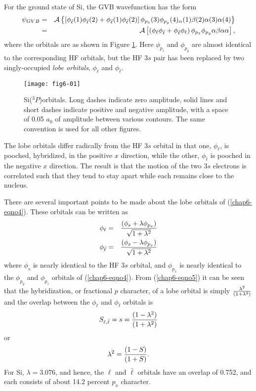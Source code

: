 For the ground state of Si, the GVB wavefunction 
has the form
\begin{eqnarray}
\psi_{GVB} &=& {\cal A} \left\{ \left[ \phi_{\bar{\ell}} (1) 
\phi_{\bar{\ell}} (2) + 
\phi_{\bar{\ell}} (1) \phi_{\bar{\ell}} (2) \right] \phi_{p_z} (3) \phi_{p_y} 
(4)_ \alpha (1) \beta (2) \alpha (3) \alpha (4) \right\}\cr
&=& {\cal A} \left[ \left( \phi_{\ell} \phi_{\bar{\ell}} + 
\phi_{\bar{\ell}} \phi_{\ell} \right) 
\phi_{p_z} \phi_{p_y} \alpha \beta \alpha \alpha \right],
\label{chap6-eqno4}
\end{eqnarray}
where the orbitals are as shown in Figure \ref{chap6-fig1}.  Here
$\phi_{p_z}$ and $\phi_{p_y}$ are almost identical to the
corresponding HF orbitals, but the HF $3s$ pair has been replaced by
two singly-occupied \emph{lobe orbitals}, $\phi_{\ell}$ and
$\phi_{\bar{\ell}}$.

\begin{figure}
\texttt{[image: fig6-01]}
\caption{Si(${^3P}$)orbitals.  Long dashes indicate zero amplitude,
solid lines and short dashes indicate positive and negative amplitude,
with a space of 0.05 $a_0$ of amplitude between various contours.  The
same convention is used for all other figures.}
\label{chap6-fig1}
\end{figure}

The lobe orbitals differ radically from the HF $3s$ orbital 
in that one, $\phi_{\ell}$, is pooched, hybridized, in the positive $x$ 
direction, while the other, $\phi_{\bar{\ell}}$ is pooched in the negative $x$ 
direction.  The result is that the motion of the two $3s$ electrons is 
correlated such that they tend to stay apart while each remains close 
to the nucleus.

There are several important points to be made about the lobe orbitals 
of (\ref{chap6-eqno4}).  These orbitals can be written as
\begin{eqnarray}
\phi_{\ell} &=& {(\phi_s + \lambda \phi_{p_x} ) \over \sqrt{1 + 
\lambda^2}}\cr
\phi_{\bar{\ell}} &=& {( \phi_s - \lambda \phi_{p_x} ) \over \sqrt{1 + 
\lambda^2}}
\label{chap6-eqno5}
\end{eqnarray}
where $\phi_s$ is nearly identical to the HF $3s$ orbital,
and $\phi_{p_x}$ is nearly identical to the $\phi_{p_y}$ and
$\phi_{p_z}$ orbitals of (\ref{chap6-eqno4}).  From
(\ref{chap6-eqno5}) it can be seen that the hybridization, or
fractional $p$ character, of a lobe orbital is simply
${\lambda^2 \over (1 + \lambda^2)}$
and the overlap between the $\phi_{\ell}$ and $\phi_{\bar{\ell}}$ orbitals is
\begin{equation}
S_{\ell,{\bar{\ell}}} = s = {(1 - \lambda^2) \over (1 + \lambda^2)}
\end{equation}
or
\begin{equation}
\lambda^2 = {(1 - S) \over (1+S)} .
\end{equation}
For Si, $\lambda = 3.076$, and hence, the $\ell$ and ${\bar{\ell}}$ orbitals 
have an overlap of 0.752, and each consists of about 14.2 percent 
$p_x$ character.

